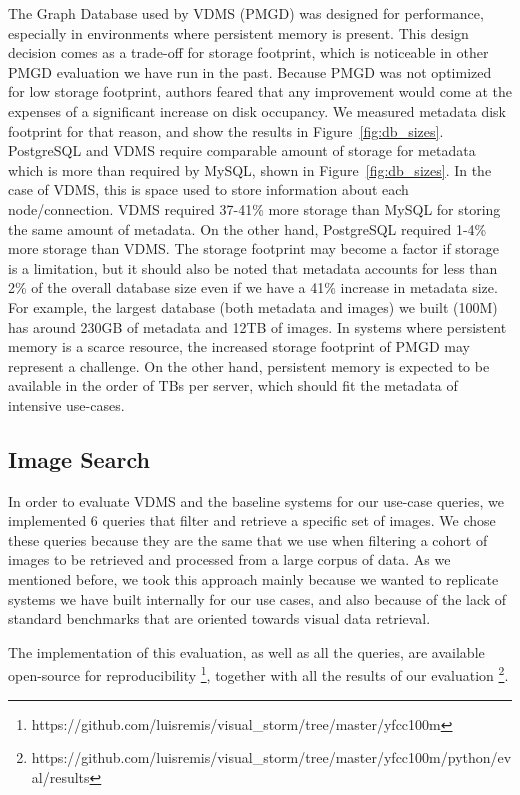 The Graph Database used by VDMS (PMGD) was designed for performance,
especially in environments where persistent memory is present.
This design decision comes as a trade-off for storage footprint, which is
noticeable in other PMGD evaluation we have run in the past.
Because PMGD was not optimized for low storage footprint, authors feared that
any improvement would come at the expenses of a significant increase on
disk occupancy.
We measured metadata disk footprint for that reason, and show the results
in Figure~\ref{fig:db_sizes}.
PostgreSQL and VDMS require comparable amount of storage for metadata which
is more than required by MySQL, shown in Figure~\ref{fig:db_sizes}.
In the case of VDMS, this is space used to store information about
each node/connection.
VDMS required 37-41\% more storage than MySQL for storing the same amount
of metadata. On the other hand, PostgreSQL required 1-4\% more storage than VDMS.
The storage footprint may become a factor if storage is a limitation, but
it should also be noted that metadata accounts for less than 2\% of the
overall database size even if we have a 41\% increase in metadata size.
For example, the largest database (both metadata and images) we built
(100M) has around 230GB of metadata and 12TB of images.
In systems where persistent memory is a scarce resource,
the increased storage footprint of PMGD may represent a challenge.
On the other hand, persistent memory is expected to be available
in the order of TBs per server, which should fit the
metadata of intensive use-cases\cite{IntelXPoint15}.


\subsection{Image Search}
\label{images}

In order to evaluate VDMS and the baseline systems for our use-case queries,
we implemented 6 queries that filter and retrieve a specific set of images.
We chose these queries because they are the same that we use when filtering a
cohort of images to be retrieved and processed from a large corpus of data.
As we mentioned before, we took this approach mainly because we wanted to
replicate systems we have built internally for our use cases,
and also because of the lack of standard
benchmarks that are oriented towards visual data retrieval.

The implementation of this evaluation, as well as all the queries, are available
open-source for reproducibility
\footnote{https://github.com/luisremis/visual\_storm/tree/master/yfcc100m},
together with all the results of our evaluation
\footnote{https://github.com/luisremis/visual\_storm/tree/master/yfcc100m/python/eval/results}.

